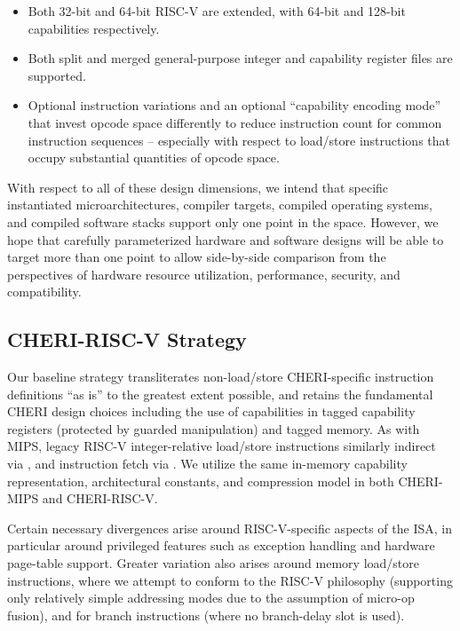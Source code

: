 \begin{itemize}
\item Both 32-bit and 64-bit RISC-V are extended, with 64-bit and 128-bit
  capabilities respectively.

\item Both split and merged general-purpose integer and capability register
  files are supported.

%

\item Optional instruction variations and an optional ``capability encoding
  mode'' that
  invest opcode space differently to reduce instruction count for common
  instruction sequences -- especially with respect to load/store instructions
  that occupy substantial quantities of opcode space.
\end{itemize}

With respect to all of these design dimensions, we intend that specific
instantiated microarchitectures, compiler targets, compiled operating systems,
and compiled software stacks support only one point in the space.
However, we hope that carefully parameterized hardware and software designs
will be able to target more than one point to allow side-by-side comparison
from the perspectives of hardware resource utilization, performance, security,
and compatibility.

\subsection{CHERI-RISC-V Strategy}

Our baseline strategy transliterates non-load/store CHERI-specific
instruction definitions ``as is'' to the greatest extent possible, and retains
the fundamental CHERI design choices including the use of capabilities in
tagged capability registers (protected by guarded manipulation) and tagged
memory.
As with MIPS, legacy RISC-V integer-relative load/store instructions similarly
indirect via \DDC{}, and instruction fetch via \PCC{}.
We utilize the same in-memory capability representation, architectural
constants, and compression model in both CHERI-MIPS and CHERI-RISC-V.

Certain necessary divergences arise around RISC-V-specific aspects of the ISA,
in particular around privileged features such as exception handling and
hardware page-table support.
Greater variation also arises around memory load/store instructions, where we
attempt to conform to the RISC-V philosophy (supporting only relatively simple
addressing modes due to the assumption of micro-op fusion), and for branch
instructions (where no branch-delay slot is used).

